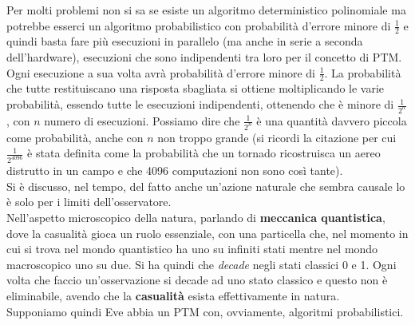 \documentclass[a4paper,12pt, oneside]{book}
\begin{document}
Per molti problemi non si sa se esiste un algoritmo deterministico polinomiale
ma potrebbe esserci un algoritmo probabilistico con probabilità d'errore minore
di $\frac{1}{2}$ e quindi basta fare più esecuzioni in parallelo (ma anche in
serie a seconda dell'hardware), esecuzioni che sono indipendenti tra loro per
il concetto di PTM. Ogni esecuzione a sua volta avrà probabilità d'errore minore
di $\frac{1}{2}$. La probabilità che tutte restituiscano una risposta sbagliata
si ottiene moltiplicando le varie probabilità, essendo tutte le esecuzioni
indipendenti, ottenendo che è minore di $\frac{1}{2^n}$, con $n$ numero di
esecuzioni. Possiamo dire che $\frac{1}{2^n}$ è una quantità davvero piccola
come probabilità, anche con $n$ non troppo grande (si ricordi la citazione per
cui $\frac{1}{2^{4096}}$ è stata definita come la probabilità che un tornado
ricostruisca un aereo distrutto in un campo e che 4096 computazioni non sono
così tante).\\
Si è discusso, nel tempo, del fatto anche un'azione naturale che sembra causale
lo è solo per i limiti dell'osservatore.\\
Nell'aspetto microscopico della natura, parlando di \textbf{meccanica
  quantistica}, dove la casualità gioca un ruolo essenziale, con una particella
che, nel momento in cui si trova nel mondo quantistico ha uno su infiniti stati
mentre nel mondo macroscopico uno su due. Si ha quindi che \textit{decade} negli
stati classici 0 e 1. Ogni volta che faccio un'osservazione si decade ad uno
stato classico e questo non è eliminabile, avendo che la \textbf{casualità}
esista effettivamente in natura.\\
Supponiamo quindi Eve abbia un PTM con, ovviamente, algoritmi probabilistici.
\end{document}

